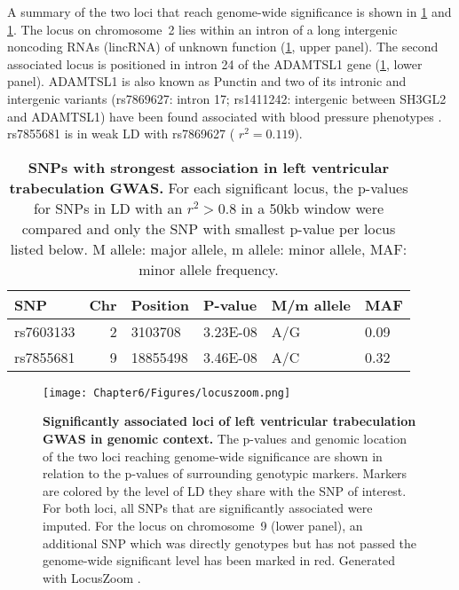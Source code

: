 %
\noindent A summary of the two loci that reach genome-wide significance is shown in \cref{tab:sig-FD} and \cref{fig:locuszoom-fd}. The locus on chromosome~2 lies within an intron of a long intergenic noncoding RNAs (lincRNA) of unknown function (\cref{fig:locuszoom-fd}, upper panel). The second associated locus is positioned in intron \num{24} of the ADAMTSL1 gene (\cref{fig:locuszoom-fd}, lower panel). ADAMTSL1 is also known as Punctin and two of its intronic and intergenic variants  (rs7869627: intron \num{17}; rs1411242: intergenic between SH3GL2 and ADAMTSL1) have been found associated with blood pressure phenotypes \citep{Sabatti2009}. rs7855681 is in weak LD with rs7869627 ( \(r^2=0.119\)). 

\begin{table}[htbp]
  \centering
  \caption[\textbf{SNPs with strongest association in left ventricular trabeculation GWAS. }]{\textbf{SNPs with strongest association in left ventricular trabeculation GWAS. } For each significant locus, the p-values for SNPs in LD with an \(r^2 > 0.8\) in a \num{50}kb window were compared and only the SNP with smallest p-value per locus listed below. M allele: major allele, m allele:  minor allele, MAF: minor allele frequency. }
    \begin{tabular}{lrllll}
    \toprule
    SNP   & \multicolumn{1}{l}{Chr} & Position & P-value & M/m allele & MAF \\
    \midrule
    rs7603133 & 2     & \num{3103708} & \num{3.23E-08} & A/G     & \num{0.09} \\
    rs7855681 & 9     & \num{18855498} & \num{3.46E-08} & A/C     & \num{0.32} \\
    \bottomrule
    \end{tabular}%
  \label{tab:sig-FD}%
\end{table}%
%
\begin{figure}[hbtp]
	\centering
	\texttt{[image: Chapter6/Figures/locuszoom.png]}
	\caption[\textbf{Significantly associated loci of left ventricular trabeculation GWAS in genomic context. }]{\textbf{Significantly associated loci of left ventricular trabeculation GWAS in genomic context. }The p-values and genomic location of the two loci reaching genome-wide significance are shown in relation to the p-values of surrounding genotypic markers. Markers are colored by the level of LD they share with the SNP of interest. For both loci, all SNPs that are significantly associated were imputed. For the locus on chromosome~9 (lower panel), an additional SNP which was directly genotypes but has not passed the genome-wide significant level has been marked in red. Generated with LocusZoom \citep{Pruim2010}.}  
	 	\label{fig:locuszoom-fd}
\end{figure}
